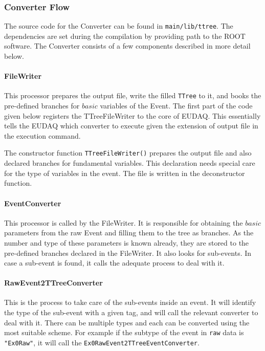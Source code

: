  \subsubsection{ Converter Flow} 
 
  The source code for the Converter can be found in \lstinline[style=cpp]{main/lib/ttree}. The dependencies are set during the compilation by providing path to the ROOT software. The Converter consists of a few components described in more detail below. 
  
   \paragraph {FileWriter}
 This processor prepares the output file, write the filled \lstinline[style=cpp]{TTree} to it, and books the pre-defined branches for $basic$ variables of the Event. The first part of the code given below registers the TTreeFileWriter to the core of EUDAQ. This essentially tells the EUDAQ which converter to execute given the extension of output file in the execution command. 
\begin{listing}[mybash]
namespace{auto dummy01 = Factory<FileWriter>::Register<TTreeFileWriter, std::string&>(cstr2hash("root"));
\end{listing}

 The constructor function \lstinline[style=cpp]{TTreeFileWriter()} prepares the output file and also declared branches for fundamental variables. This declaration needs special care for the type of variables in the event. The file is written in the deconstructor function.
   \paragraph {EventConverter} This processor is called by the FileWriter. It is responsible for obtaining the $basic$ parameters from the raw Event and filling them to the tree as branches. As the number and type of these parameters is known already, they are stored to the pre-defined branches declared in the FileWriter. It also looks for sub-events. In case a sub-event is found, it calls the adequate process to deal with it. 
   \paragraph {RawEvent2TTreeConverter} This is the process to take care of the sub-events inside an event. It will identify the type of the sub-event with a given tag, and will call the relevant converter to deal with it. There can be multiple types and each can be converted using the most suitable scheme. For example if the subtype of the event in \lstinline[style=cpp]{raw} data is \lstinline[style=cpp]{"Ex0Raw"}, it will call the \lstinline[style=cpp]{Ex0RawEvent2TTreeEventConverter}. 

